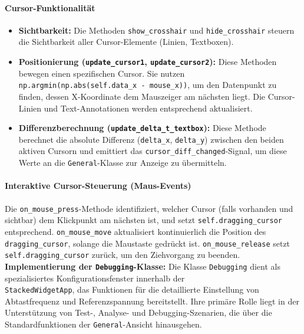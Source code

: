 \documentclass[a4paper, portrait, 12pt]{scrartcl} %
\begin{document}
\paragraph{Cursor-Funktionalität}
\begin{itemize}
    \item \textbf{Sichtbarkeit:} Die Methoden \texttt{show\_crosshair} und \texttt{hide\_crosshair} steuern die Sichtbarkeit aller Cursor-Elemente (Linien, Textboxen).
    \item \textbf{Positionierung (\texttt{update\_cursor1}, \texttt{update\_cursor2}):} Diese Methoden bewegen einen spezifischen Cursor. Sie nutzen \texttt{np.argmin(np.abs(self.data\_x - mouse\_x))}, um den Datenpunkt zu finden, dessen X-Koordinate dem Mauszeiger am nächsten liegt. Die Cursor-Linien und Text-Annotationen werden entsprechend aktualisiert.
    \item \textbf{Differenzberechnung (\texttt{update\_delta\_t\_textbox}):} Diese Methode berechnet die absolute Differenz (\texttt{delta\_x}, \texttt{delta\_y}) zwischen den beiden aktiven Cursorn und emittiert das \texttt{cursor\_diff\_changed}-Signal, um diese Werte an die \texttt{General}-Klasse zur Anzeige zu übermitteln.
\end{itemize}

\paragraph{Interaktive Cursor-Steuerung (Maus-Events)}
Die \texttt{on\_mouse\_press}-Methode identifiziert, welcher Cursor (falls vorhanden und sichtbar) dem Klickpunkt am nächsten ist, und setzt \texttt{self.dragging\_cursor} entsprechend. \texttt{on\_mouse\_move} aktualisiert kontinuierlich die Position des \texttt{dragging\_cursor}, solange die Maustaste gedrückt ist. \texttt{on\_mouse\_release} setzt \texttt{self.dragging\_cursor} zurück, um den Ziehvorgang zu beenden.\\

\textbf{Implementierung der \texttt{Debugging}-Klasse:}
Die Klasse \texttt{Debugging} dient als spezialisiertes Konfigurationsfenster innerhalb der \\\texttt{StackedWidgetApp}, das Funktionen für die detaillierte Einstellung von Abtastfrequenz und Referenzspannung bereitstellt. Ihre primäre Rolle liegt in der Unterstützung von Test-, Analyse- und Debugging-Szenarien, die über die Standardfunktionen der \texttt{General}-Ansicht hinausgehen.\\
\end{document}
